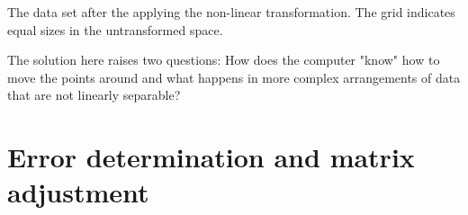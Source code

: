 \documentclass[a4paper, justified]{tufte-handout}
\makeatletter
\def\sigmoidscale{1}
\def\sigmoidtransformation{%
\pgf@xa=\pgf@x%
\pgf@ya=\pgf@y%
\pgfmathsetmacro{\sigmoidx}{\sigmoidscale*1cm/(1+exp(min(-\pgf@xa/1cm, 5)))}%
\pgfmathsetmacro{\sigmoidy}{\sigmoidscale*1cm/(1+exp(min(-\pgf@ya/1cm, 5)))}%
\pgf@x=\sigmoidx pt
\pgf@y=\sigmoidy pt
}
\makeatother
\begin{document}
\begin{marginfigure}[-150pt]
\caption{The data set after the applying the non-linear transformation. The grid indicates equal sizes in the untransformed space.}\label{fig:finalsimplesolution}
\end{marginfigure}


The solution here raises two questions: How does the computer "know" how to move the points around and what happens in more complex arrangements of data that are not linearly separable?

\section{Error determination and matrix adjustment}
\end{document}
